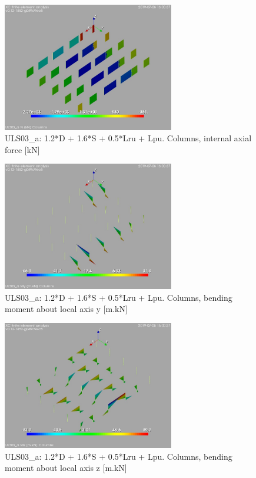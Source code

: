 \begin{figure}
\begin{center}
\includegraphics[width=75mm]{annex_res_columns/graphics/resSimplLC/ULS03_acolumnsN}
\caption{ULS03\_a: 1.2*D + 1.6*S + 0.5*Lru + Lpu. Columns, internal axial force [kN]}
\end{center}
\end{figure}
\begin{figure}
\begin{center}
\includegraphics[width=75mm]{annex_res_columns/graphics/resSimplLC/ULS03_acolumnsMy}
\caption{ULS03\_a: 1.2*D + 1.6*S + 0.5*Lru + Lpu. Columns, bending moment about local axis y [m.kN]}
\end{center}
\end{figure}
\begin{figure}
\begin{center}
\includegraphics[width=75mm]{annex_res_columns/graphics/resSimplLC/ULS03_acolumnsMz}
\caption{ULS03\_a: 1.2*D + 1.6*S + 0.5*Lru + Lpu. Columns, bending moment about local axis z [m.kN]}
\end{center}
\end{figure}
